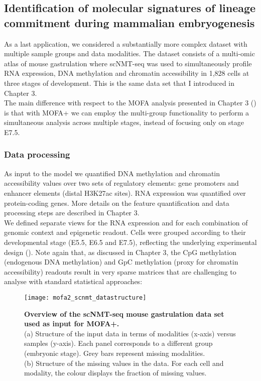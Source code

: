 \subsection{Identification of molecular signatures of lineage commitment during mammalian embryogenesis}

As a last application, we considered a substantially more complex dataset with multiple sample groups and data modalities. The dataset consists of a multi-omic atlas of mouse gastrulation where scNMT-seq was used to simultaneously profile RNA expression, DNA methylation and chromatin accessibility in 1,828 cells at three stages of development\cite{Argelaguet2019}. This is the same data set that I introduced in Chapter 3.\\
The main difference with respect to the MOFA analysis presented in Chapter 3 () is that with MOFA+ we can employ the multi-group functionality to perform a simultaneous analysis across multiple stages, instead of focusing only on stage E7.5.

\subsubsection{Data processing}

As input to the model we quantified DNA methylation and chromatin accessibility values over two sets of regulatory elements: gene promoters and enhancer elements (distal H3K27ac sites). RNA expression was quantified over protein-coding genes. More details on the feature quantification and data processing steps are described in Chapter 3.\\
We defined separate views for the RNA expression and for each combination of genomic context and epigenetic readout. Cells were grouped according to their developmental stage (E5.5, E6.5 and E7.5), reflecting the underlying experimental design\cite{Argelaguet2019} (). Note again that, as discussed in Chapter 3, the CpG methylation (endogenous DNA methylation) and GpC methylation (proxy for chromatin accessibility) readouts result in very sparse matrices that are challenging to analyse with standard statistical approaches:

\begin{figure}[H]
	\centering
	\texttt{[image: mofa2\_scnmt\_datastructure]}
	\caption[]{
	\textbf{Overview of the scNMT-seq mouse gastrulation data set used as input for MOFA+.}\\
	(a) Structure of the input data in terms of modalities (x-axis) versus samples (y-axis). Each panel corresponds to a different group (embryonic stage). Grey bars represent missing modalities. \\
	(b) Structure of the missing values in the data. For each cell and modality, the colour displays the fraction of missing values.
	}
	\label{fig:mofa2_scnmt_datastructure}
\end{figure}

